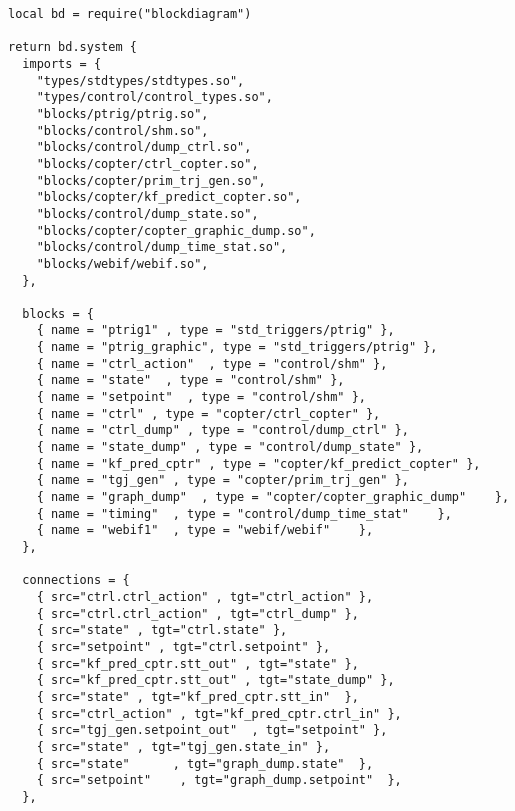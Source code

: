 	
\begin{lstlisting}[language={[5.0]Lua},]
local bd = require("blockdiagram")

return bd.system {
  imports = {
    "types/stdtypes/stdtypes.so",
    "types/control/control_types.so",
    "blocks/ptrig/ptrig.so",
    "blocks/control/shm.so",
    "blocks/control/dump_ctrl.so",
    "blocks/copter/ctrl_copter.so",
    "blocks/copter/prim_trj_gen.so",
    "blocks/copter/kf_predict_copter.so",
    "blocks/control/dump_state.so",
    "blocks/copter/copter_graphic_dump.so",
    "blocks/control/dump_time_stat.so",
    "blocks/webif/webif.so",
  },

  blocks = {
    { name = "ptrig1" , type = "std_triggers/ptrig" },
    { name = "ptrig_graphic", type = "std_triggers/ptrig" },
    { name = "ctrl_action"  , type = "control/shm" },
    { name = "state"  , type = "control/shm" },
    { name = "setpoint"  , type = "control/shm" },
    { name = "ctrl" , type = "copter/ctrl_copter" },
    { name = "ctrl_dump" , type = "control/dump_ctrl" },
    { name = "state_dump" , type = "control/dump_state" },
    { name = "kf_pred_cptr" , type = "copter/kf_predict_copter" },
    { name = "tgj_gen" , type = "copter/prim_trj_gen" },
    { name = "graph_dump"  , type = "copter/copter_graphic_dump"    },
    { name = "timing"  , type = "control/dump_time_stat"    },
    { name = "webif1"  , type = "webif/webif"    },
  },

  connections = {
    { src="ctrl.ctrl_action" , tgt="ctrl_action" },
    { src="ctrl.ctrl_action" , tgt="ctrl_dump" },
    { src="state" , tgt="ctrl.state" },
    { src="setpoint" , tgt="ctrl.setpoint" },
    { src="kf_pred_cptr.stt_out" , tgt="state" },
    { src="kf_pred_cptr.stt_out" , tgt="state_dump" },
    { src="state" , tgt="kf_pred_cptr.stt_in"  },
    { src="ctrl_action" , tgt="kf_pred_cptr.ctrl_in" },
    { src="tgj_gen.setpoint_out"  , tgt="setpoint" },
    { src="state" , tgt="tgj_gen.state_in" },
    { src="state"      , tgt="graph_dump.state"  },
    { src="setpoint"    , tgt="graph_dump.setpoint"  },
  },


\end{lstlisting}
